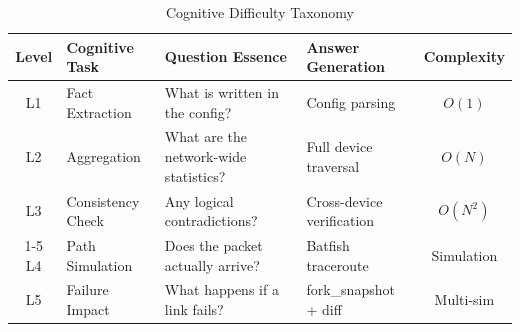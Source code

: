 \begin{table}[!t]
  \caption{Cognitive Difficulty Taxonomy}
  \label{tab:difficulty_taxonomy}
  \centering
  \small
  \begin{tabular}{clllc}
    \toprule
    \textbf{Level} & \textbf{Cognitive Task} & \textbf{Question Essence} & \textbf{Answer Generation} & \textbf{Complexity} \\
    \midrule
    L1 & Fact Extraction    & What is written in the config?       & Config parsing              & $O(1)$   \\
    L2 & Aggregation        & What are the network-wide statistics? & Full device traversal       & $O(N)$   \\
    L3 & Consistency Check  & Any logical contradictions?           & Cross-device verification   & $O(N^2)$ \\
    \cmidrule(lr){1-5}
    L4 & Path Simulation    & Does the packet actually arrive?      & Batfish traceroute          & Simulation \\
    L5 & Failure Impact     & What happens if a link fails?         & fork\_snapshot + diff       & Multi-sim  \\
    \bottomrule
  \end{tabular}
\end{table}
